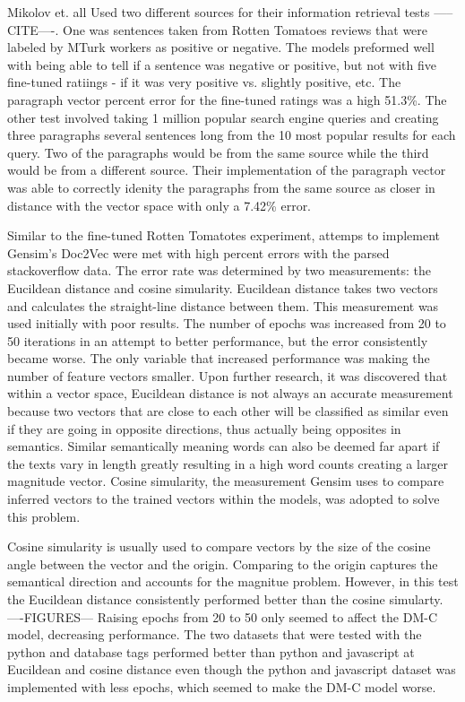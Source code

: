 Mikolov et. all Used two different sources for their information retrieval tests -----CITE----. One was sentences taken from Rotten Tomatoes reviews that were labeled by MTurk workers as positive or negative. The models preformed well with being able to tell if a sentence was negative or positive, but not with five fine-tuned ratiings - if it was very positive vs. slightly positive, etc. The paragraph vector percent error for the fine-tuned ratings was a high 51.3\%. The other test involved taking 1 million popular search engine queries and creating three paragraphs several sentences long from the 10 most popular results for each query. Two of the paragraphs would be from the same source while the third would be from a different source. Their implementation of the paragraph vector was able to correctly idenity the paragraphs from the same source as closer in distance with the vector space with only a 7.42\% error. 

Similar to the fine-tuned Rotten Tomatotes experiment, attemps to implement Gensim's Doc2Vec were met with high percent errors with the parsed stackoverflow data. The error rate was determined by two measurements: the Eucildean distance and cosine simularity. Eucildean distance takes two vectors and calculates the straight-line distance between them. This measurement was used initially with poor results. The number of epochs was increased from 20 to 50 iterations in an attempt to better performance, but the error consistently became worse. The only variable that increased performance was making the number of feature vectors smaller. Upon further research, it was discovered that within a vector space, Eucildean distance is not always an accurate measurement because two vectors that are close to each other will be classified as similar even if they are going in opposite directions, thus actually being opposites in semantics. Similar semantically meaning words can also be deemed far apart if the texts vary in length greatly resulting in a high word counts creating a larger magnitude vector. Cosine simularity, the measurement Gensim uses to compare inferred vectors to the trained vectors within the models, was adopted to solve this problem.

Cosine simularity is usually used to compare vectors by the size of the cosine angle between the vector and the origin. Comparing to the origin captures the semantical direction and accounts for the magnitue problem. However, in this test the Eucildean distance consistently performed better than the cosine simularty.  ----FIGURES---  Raising epochs from 20 to 50 only seemed to affect the DM-C model, decreasing performance. The two datasets that were tested with the python and database tags performed better than python and javascript at Eucildean and cosine distance even though the python and javascript dataset was implemented with less epochs, which seemed to make the DM-C model worse. 

